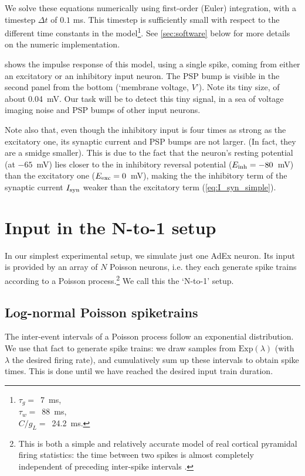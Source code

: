 We solve these equations numerically using first-order (Euler) integration, with a timestep $Δt$ of $0.1$ ms. This timestep is sufficiently small with respect to the different time constants in the model\footnote{$τ_g = $~7~ms,\\$τ_w = $~88~ms,\\$C / g_L = $~24.2~ms.}. See \cref{sec:software} below for more details on the numeric implementation.

 shows the impulse response of this model, using a single spike, coming from either an excitatory or an inhibitory input neuron. The PSP bump is visible in the second panel from the bottom (`membrane voltage, $V$'). Note its tiny size, of about 0.04~mV. Our task will be to detect this tiny signal, in a sea of voltage imaging noise and PSP bumps of other input neurons.

Note also that, even though the inhibitory input is four times as strong as the excitatory one, its synaptic current and PSP bumps are not larger. (In fact, they are a smidge smaller). This is due to the fact that the neuron's resting potential (at $-65$~mV) lies closer to the in inhibitory reversal potential ($E_{\text{inh}} = -80$~mV) than the excitatory one ($E_{\text{exc}} = 0$~mV), making the the inhibitory term of the synaptic current $I_{\text{syn}}$ weaker than the excitatory term  (\cref{eq:I_syn_simple}).



\FloatBarrier
\section{Input in the N-to-1 setup}
\label{sec:lognormal-poisson-input}

In our simplest experimental setup, we simulate just one AdEx neuron.
Its input is provided by an array of $N$ Poisson neurons, i.e. they each generate spike trains according to a Poisson process.\footnote{
    This is both a simple and relatively accurate model of real cortical pyramidal firing statistics: the time between two spikes is almost completely independent of preceding inter-spike intervals \cite{Softky1993HighlyIrregularFiringa}.
}
We call this the `N-to-1' setup.

\subsection{Log-normal Poisson spiketrains}

The inter-event intervals of a Poisson process follow an exponential distribution.
We use that fact to generate spike trains: we draw samples from $\mathrm{Exp}(\lambda)$ (with $\lambda$ the desired firing rate), and cumulatively sum up these intervals  to obtain spike times. This is done until we have reached the desired input train duration.

